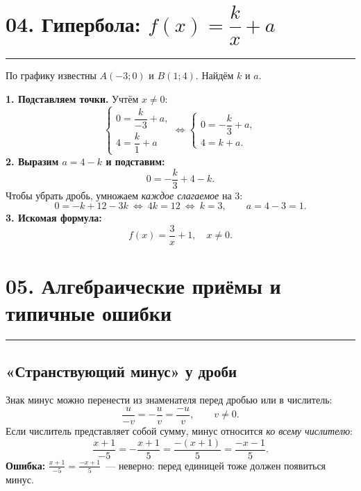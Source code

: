 \documentclass[a4paper,12pt]{article}
\newcommand{\sectionline}{\par\vspace{-4pt}\noindent\textcolor{accent}{\rule{\linewidth}{0.55pt}}\par\vspace{3pt}}
\begin{document}
\section*{04. Гипербола: \(f(x)=\dfrac{k}{x}+a\)}
\sectionline
По графику известны \(A(-3;0)\) и \(B(1;4)\). Найдём \(k\) и \(a\).
\begin{center}
\end{center}
\textbf{1. Подставляем точки.} Учтём \(x\ne0\):
\[
\begin{cases}0=\dfrac{k}{-3}+a,\\[1mm]4=\dfrac{k}{1}+a\end{cases}
\Longleftrightarrow
\begin{cases}0=-\dfrac{k}{3}+a,\\[1mm]4=k+a.\end{cases}
\]
\textbf{2. Выразим \(a=4-k\) и подставим:}
\[
0=-\frac{k}{3}+4-k.
\]
Чтобы убрать дробь, умножаем \emph{каждое слагаемое} на \(3\):
\[
0=-k+12-3k\ \Longleftrightarrow\ 4k=12
\ \Longleftrightarrow\ k=3,\qquad a=4-3=1.
\]
\textbf{3. Искомая формула:}
\[
\boxed{f(x)=\frac3x+1,\quad x\ne0}.
\]
\clearpage

\section*{05. Алгебраические приёмы и типичные ошибки}
\sectionline
\subsection*{«Странствующий минус» у дроби}
Знак минус можно перенести из знаменателя перед дробью или в числитель:
\[
\frac{u}{-v}=-\frac{u}{v}=\frac{-u}{v},\qquad v\ne0.
\]
Если числитель представляет собой сумму, минус относится \emph{ко всему числителю}:
\[
\frac{x+1}{-5}=-\frac{x+1}{5}=\frac{-(x+1)}5
=\frac{-x-1}{5}.
\]
\textbf{Ошибка:} \(\displaystyle\frac{x+1}{-5}=\frac{-x+1}{5}\)~--- неверно: перед единицей тоже должен появиться минус.
\end{document}
